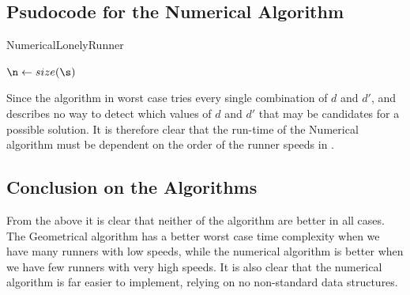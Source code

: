 \subsection{Psudocode for the Numerical Algorithm}
\begin{algorithm}[H]
  \caption{NumericalLonelyRunner}
  \highlights
  
  $\n \gets size(\s)$

  \return \no
\end{algorithm}

Since the algorithm in worst case tries every single combination of
$d$ and $d\prime$, and \cite{invis} describes no way to detect which
values of $d$ and $d\prime$ that may be candidates for a possible
solution. It is therefore clear that the run-time of the Numerical
algorithm must be dependent on the order of the runner speeds in \comS.



\subsection{Conclusion on the Algorithms}

From the above it is clear that neither of the algorithm are better in all cases. The Geometrical algorithm has a better worst case time complexity when we have many runners with low speeds, while the numerical algorithm is better when we have few runners with very high speeds. It is also clear that the numerical algorithm is far easier to implement, relying on no non-standard data structures.

